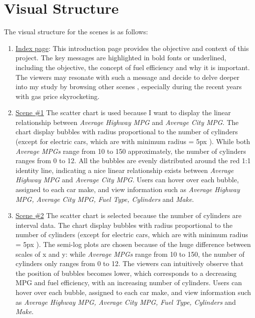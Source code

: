 \documentclass[11pt]{article}
\begin{document}
\section{Visual Structure}
The visual structure for the scenes is as follows:
\begin{enumerate}
	\item \underline{Index page}:
		This introduction page provides the objective and context of this project. The key messages are highlighted in bold fonts or underlined, including the objective, the concept of fuel efficiency and why it is important. The viewers may resonate with such a message and decide to delve deeper into my study by browsing other scenes , especially during the recent years with gas price skyrocketing.
	\item \underline{Scene \#1}
	  The scatter chart is used because I want to display the linear relationship between \textit{Average Highway MPG} and \textit{Average City MPG}. The chart display bubbles with radius proportional to the number of cylinders (except for electric cars, which are with minimum radius = 5px ).  While both \textit{Average MPGs} range from 10 to 150 approximately, the number of cylinders ranges from 0 to 12. All the bubbles are evenly distributed around the red 1:1 identity line, indicating a nice linear relationship exists between \textit{Average Highway MPG} and \textit{Average City MPG}. Users can hover over each bubble, assigned to each car make, and view information such as \textit{Average Highway MPG, Average City MPG, Fuel Type, Cylinders} and  \textit{Make}.
	  
	\item \underline{Scene \#2}
	 The scatter chart is selected because the number of cylinders are interval data. The chart display bubbles with radius proportional to the number of cylinders (except for electric cars, which are with minimum radius = 5px ).  The semi-log plots are chosen because of the huge difference between scales of x and y: while \textit{Average MPGs} range from 10 to 150, the number of cylinders only ranges from 0 to 12. The viewers can intuitively observe that the position of bubbles becomes lower, which corresponds to a decreasing MPG and fuel efficiency,  with an increasing number of cylinders. Users can hover over each bubble, assigned to each car make, and view information such as \textit{Average Highway MPG, Average City MPG, Fuel Type, Cylinders} and  \textit{Make}.
	

\end{enumerate}
\end{document}
